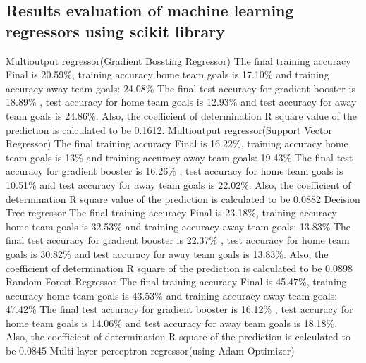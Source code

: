\subsection{Results evaluation of machine learning regressors using scikit library}
Multioutput regressor(Gradient Bossting Regressor)\newline
The final training accuracy Final is 20.59\%, training accuracy home team goals is 17.10\% and training accuracy away team goals: 24.08\% \newline
The final test accuracy for gradient booster is 18.89\% , test accuracy for home team goals is 12.93\% and test accuracy for away team goals is 24.86\%. Also, the coefficient of determination R square value of the prediction is calculated to be 0.1612.\newline
Multioutput regressor(Support Vector Regressor)\newline
The final training accuracy Final is 16.22\%, training accuracy home team goals is 13\% and training accuracy away team goals: 19.43\% \newline
The final test accuracy for gradient booster is 16.26\% , test accuracy for home team goals is 10.51\% and test accuracy for away team goals is 22.02\%. Also, the coefficient of determination R square value of the prediction is calculated to be 0.0882 \newline
Decision Tree regressor\newline
The final training accuracy Final is 23.18\%, training accuracy home team goals is 32.53\% and training accuracy away team goals: 13.83\% \newline
The final test accuracy for gradient booster is 22.37\% , test accuracy for home team goals is 30.82\% and test accuracy for away team goals is 13.83\%. Also, the coefficient of determination R square of the prediction is calculated to be 0.0898\newline 
Random Forest Regressor\newline
The final training accuracy Final is 45.47\%, training accuracy home team goals is 43.53\% and training accuracy away team goals: 47.42\% \newline
The final test accuracy for gradient booster is 16.12\% , test accuracy for home team goals is 14.06\% and test accuracy for away team goals is 18.18\%. Also, the coefficient of determination R square of the prediction is calculated to be 0.0845 \newline 
Multi-layer perceptron regressor(using Adam Optimizer)\newline

